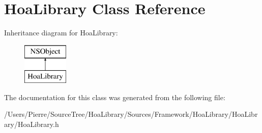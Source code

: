\hypertarget{interface_hoa_library}{\section{Hoa\-Library Class Reference}
\label{interface_hoa_library}
}
Inheritance diagram for Hoa\-Library\-:\begin{figure}[H]
\begin{center}
\leavevmode
\includegraphics[height=2.000000cm]{interface_hoa_library}
\end{center}
\end{figure}


The documentation for this class was generated from the following file\-:\begin{DoxyCompactItemize}
\item 
/\-Users/\-Pierre/\-Source\-Tree/\-Hoa\-Library/\-Sources/\-Framework/\-Hoa\-Library/\-Hoa\-Library/Hoa\-Library.\-h\end{DoxyCompactItemize}
